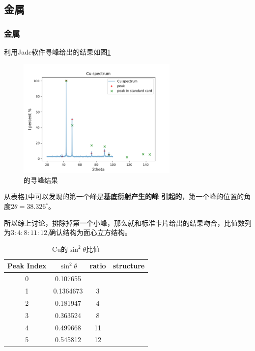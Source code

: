 \documentclass[10pt]{ctexart}
\begin{document}
\subsection{金属}
\subsubsection{金属}

利用Jade软件寻峰给出的结果如图\ref{fig:Cu}
\begin{figure}
    \centering
    \includegraphics[width=0.7\textwidth]{data/Cu/spectrum.png}
    \caption{的寻峰结果}
    \label{fig:Cu}
\end{figure}
从表格\ref{tab:CuPeakRatio}中可以发现的第一个峰是\textbf{基底衍射产生的峰
引起的}，第一个峰的位置的角度$2\theta=38.326^\circ$。

所以综上讨论，排除掉第一个小峰，那么就和标准卡片给出的结果吻合，比值数列为$3:4:8:11:12$,确认结构为面心立方结构。
\begin{table}
    \begin{tabular}{|c|c|c|c|}
        \textbf{Peak Index} & \textbf{$\sin^2{\theta}$}& \textbf{ratio}& \textbf{structure}\\
        \hline
0  &  0.107655&&\\
1  &  0.1364673&3&\\
2  &  0.181947&4&\\
3  &  0.363524&8&\\
4  &  0.499668&11&\\
5  &  0.545812&12&\\
    \end{tabular}
\centering
\caption{Cu的$\sin^2{\theta}$比值}
    \label{tab:CuPeakRatio}
\end{table}
\end{document}
